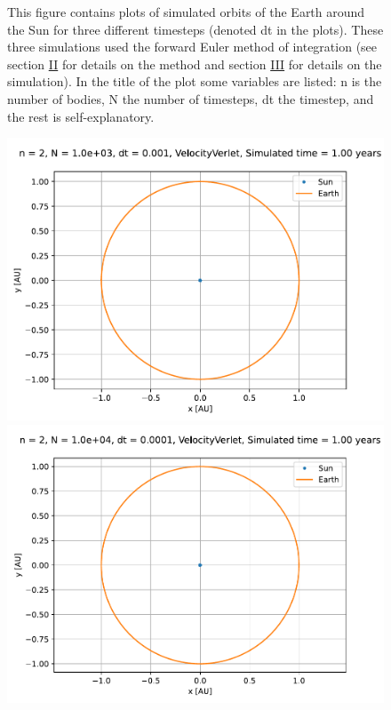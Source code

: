 \documentclass[reprint,english,notitlepage]{revtex4-1}  %
\begin{document}
\begin{figure}[H]
\caption{This figure contains plots of simulated orbits of the Earth around the Sun for three different timesteps (denoted dt in the plots). These three simulations used the forward Euler method of integration (see section \hyperref[sec:II]{II} for details on the method and section \hyperref[sec:III]{III} for details on the simulation). In the title of the plot some variables are listed: n is the number of bodies, N the number of timesteps, dt the timestep, and the rest is self-explanatory.}
\label{fig:se-fe-orbits}
\end{figure}

\begin{figure}[H]
\includegraphics[width=\columnwidth]{../data/figures/sun-earth-3c/se_dt1e-3_vv_orbit2D.pdf}
\includegraphics[width=\columnwidth]{../data/figures/sun-earth-3c/se_dt1e-4_vv_orbit2D.pdf}

\end{figure}
\end{document}
